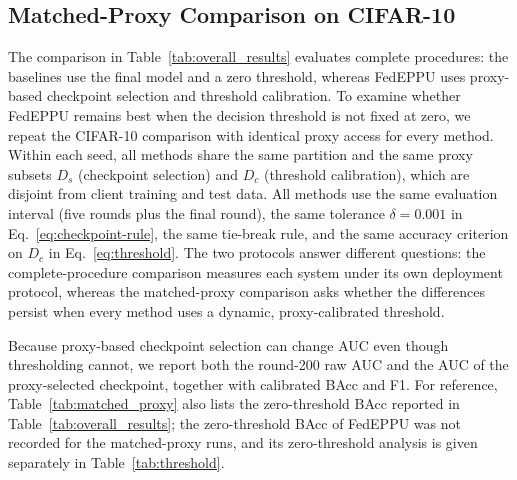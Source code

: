 \documentclass[lettersize,journal]{IEEEtran}
\begin{document}
\subsection{Matched-Proxy Comparison on CIFAR-10}
\label{sec:matched_proxy}
The comparison in Table~\ref{tab:overall_results} evaluates complete procedures: the baselines use the final model and a zero threshold, whereas FedEPPU uses proxy-based checkpoint selection and threshold calibration. To examine whether FedEPPU remains best when the decision threshold is not fixed at zero, we repeat the CIFAR-10 comparison with identical proxy access for every method. Within each seed, all methods share the same partition and the same proxy subsets $D_s$ (checkpoint selection) and $D_c$ (threshold calibration), which are disjoint from client training and test data. All methods use the same evaluation interval (five rounds plus the final round), the same tolerance $\delta=0.001$ in Eq.~\eqref{eq:checkpoint-rule}, the same tie-break rule, and the same accuracy criterion on $D_c$ in Eq.~\eqref{eq:threshold}. The two protocols answer different questions: the complete-procedure comparison measures each system under its own deployment protocol, whereas the matched-proxy comparison asks whether the differences persist when every method uses a dynamic, proxy-calibrated threshold.

Because proxy-based checkpoint selection can change AUC even though thresholding cannot, we report both the round-200 raw AUC and the AUC of the proxy-selected checkpoint, together with calibrated BAcc and F1. For reference, Table~\ref{tab:matched_proxy} also lists the zero-threshold BAcc reported in Table~\ref{tab:overall_results}; the zero-threshold BAcc of FedEPPU was not recorded for the matched-proxy runs, and its zero-threshold analysis is given separately in Table~\ref{tab:threshold}.
\end{document}
